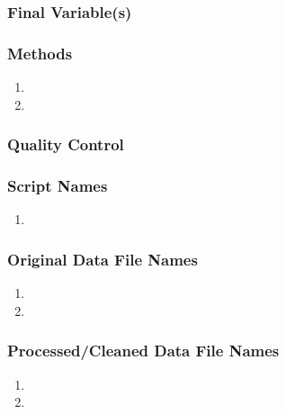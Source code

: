 \subsubsection*{Final Variable(s)}

\subsubsection*{Methods}

\begin{enumerate}
\item 
\item
\end{enumerate}

\subsubsection*{Quality Control}

\subsubsection*{Script Names}

\begin{enumerate}
\item 
\end{enumerate}

\subsubsection*{Original Data File Names}

\begin{enumerate}
\item 
\item 
\end{enumerate}

\subsubsection*{Processed/Cleaned Data File Names}

\begin{enumerate}
\item 
\item 
\end{enumerate}
